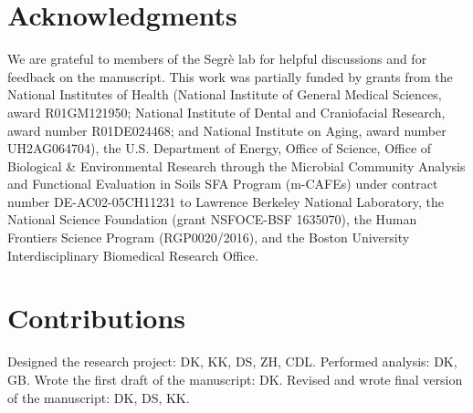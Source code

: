 
\section*{Acknowledgments}

We are grateful to members of the Segrè lab for helpful discussions and for feedback on the manuscript. This work was partially funded by grants from the National Institutes of Health (National Institute of General Medical Sciences, award R01GM121950; National Institute of Dental and Craniofacial Research, award number R01DE024468; and National Institute on Aging, award number UH2AG064704), the U.S. Department of Energy, Office of Science, Office of Biological \& Environmental Research through the Microbial Community Analysis and Functional Evaluation in Soils SFA Program (m-CAFEs) under contract number DE-AC02-05CH11231 to Lawrence Berkeley National Laboratory, the National Science Foundation (grant NSFOCE-BSF 1635070), the Human Frontiers Science Program (RGP0020/2016), and the Boston University Interdisciplinary Biomedical Research Office. 

\section*{Contributions}
Designed the research project: DK, KK, DS, ZH, CDL. Performed analysis: DK, GB. Wrote the first draft of the manuscript: DK. Revised and wrote final version of the manuscript: DK, DS, KK.
